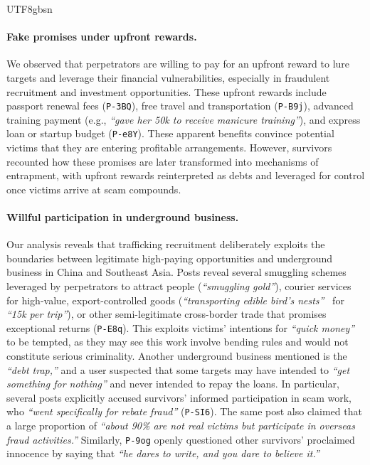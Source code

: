 \documentclass[sigconf,nonacm]{acmart}
\begin{document}
\begin{CJK}{UTF8}{gbsn}
\paragraph{\textbf{Fake promises under upfront rewards.}} We observed that perpetrators are willing to pay for an upfront reward to lure targets and leverage their financial vulnerabilities, especially in fraudulent recruitment and investment opportunities. These upfront rewards include passport renewal fees (\texttt{P-3BQ}), free travel and transportation (\texttt{P-B9j}), advanced training payment (e.g., \textit{``gave her 50k to receive manicure training''}), and express loan or startup budget (\texttt{P-e8Y}). These apparent benefits convince potential victims that they are entering profitable arrangements. However, survivors recounted how these promises are later transformed into mechanisms of entrapment, with upfront rewards reinterpreted as debts and leveraged for control once victims arrive at scam compounds.

\paragraph{\textbf{Willful participation in underground business.}} Our analysis reveals that trafficking recruitment deliberately exploits the boundaries between legitimate high-paying opportunities and underground business in China and Southeast Asia. Posts reveal several smuggling schemes leveraged by perpetrators to attract people (\textit{``smuggling gold''}), courier services for high-value, export-controlled goods (\textit{``transporting edible bird's nests''}~\cite{shukri2018consumer} for \textit{``\textyen15k per trip''}), or other semi-legitimate cross-border trade that promises exceptional returns (\texttt{P-E8q}). This exploits victims' intentions for \textit{``quick money''} to be tempted, as they may see this work involve bending rules and would not constitute serious criminality. Another underground business mentioned is the \textit{``debt trap,''}  and a user suspected that some targets may have intended to \textit{``get something for nothing''} and never intended to repay the loans. In particular, several posts explicitly accused survivors' informed participation in scam work, who \textit{``went specifically for rebate fraud''} (\texttt{P-SI6}). The same post also claimed that a large proportion of \textit{``about 90\% are not real victims but participate in overseas fraud activities.''} Similarly, \texttt{P-9og} openly questioned other survivors' proclaimed innocence by saying that \textit{``he dares to write, and you dare to believe it.''}


\end{CJK}
\end{document}
